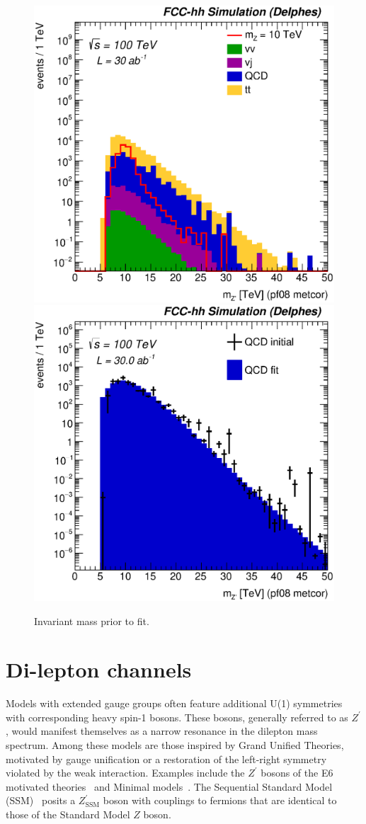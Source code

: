 \documentclass[a4paper,11pt]{article}
\newcommand{\Zp}{\ensuremath{Z^{\prime}}}
\newcommand{\ZpSSM}{\ensuremath{Z^{\prime}_{\mathrm{SSM}}}}
\newcommand{\Z}{\ensuremath{Z}}
\begin{document}
\begin{figure}[!htb]\centering
\includegraphics[width=0.45\columnwidth]{Fig/Zptt/Mj1j2_pf08_MetCorr_sel8_nostack_log.eps}
\includegraphics[width=0.45\columnwidth]{Fig/Zptt/Zptt_QCD_sel8_Mj1j2_pf08_MetCorr_fit.eps}
\caption{Invariant mass prior to fit.}
\label{fig:hadronicresonances_nofit}
\end{figure}



\section{Di-lepton channels}
\label{sec:lep}

Models with extended gauge groups often feature additional U(1) symmetries with corresponding heavy spin-1 bosons. These bosons, generally referred to as $\Zp$, would manifest themselves as a narrow resonance in the dilepton mass spectrum. Among these models are those inspired by Grand Unified Theories, motivated by gauge unification or a restoration of the left-right symmetry violated by the weak interaction. Examples include the $\Zp$ bosons of the E6 motivated theories~\cite{London:1986jz,Joglekar:2016yap,Langacker:2008yv,Hewett:1988xc} and Minimal models~\cite{Salvioni:2009mt}. The Sequential Standard Model (SSM)~\cite{Langacker:2008yv} posits a $\ZpSSM$ boson with couplings to fermions that are identical to those of the Standard Model $\Z$ boson.
\end{document}
